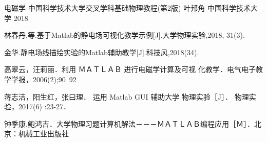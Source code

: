 \documentclass[UTF8]{article}
\numberwithin{figure}{subsection}
\numberwithin{table}{subsection}
\begin{document}
\renewcommand\refname{参考文献}


\par [1]电磁学 中国科学技术大学交叉学科基础物理教程(第2版) 叶邦角 中国科学技术大学 2018
\par [2]林春丹,等.基于Matlab的静电场可视化教学示例[J].大学物理实验,2018, 31(3).
\par [3]金华.静电场线描绘实验的Matlab辅助教学[J].科技风,2018(34).
\par [4]高翠云，汪莉丽．利用 ＭＡＴＬＡＢ 进行电磁学计算及可视 化教学．电气电子教学学报，2006(2);90~92
\par [5]蒋志洁，阳生红，张曰理． 运用 Matlab GUI 辅助大学 物理实验［J］． 物理实验，2017(6) :23-27．
\par [6]钟季康,鲍鸿吉．大学物理习题计算机解法－－－ＭＡＴＬＡＢ编程应用［Ｍ］．北京：机械工业出版社
\end{document}
